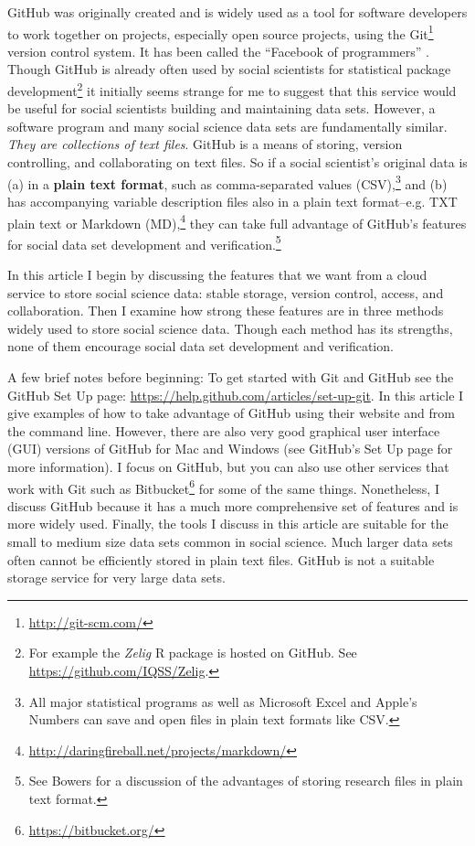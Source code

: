\documentclass[twocolumn]{article}\usepackage{graphicx, color}
\begin{document}
GitHub was originally created and is widely used as a tool for software developers to work together on projects, especially open source projects, using the Git\footnote{\url{http://git-scm.com/}} version control system. It has been called the ``Facebook of programmers'' \citep{Xie2011}. Though GitHub is already often used by social scientists for statistical package development\footnote{For example the \emph{Zelig} R package \citep{Zelig2008,R-zelig} is hosted on GitHub. See \url{https://github.com/IQSS/Zelig}.} it initially seems strange for me to suggest that this service would be useful for social scientists building and maintaining data sets. However, a software program and many social science data sets are fundamentally similar. \emph{They are collections of text files}. GitHub is a means of storing, version controlling, and collaborating on text files. So if a social scientist's original data is (a) in a \textbf{plain text format}, such as comma-separated values (CSV),\footnote{All major statistical programs as well as Microsoft Excel and Apple's Numbers can save and open files in plain text formats like CSV.} and (b) has accompanying variable description files also in a plain text format--e.g. TXT plain text or Markdown (MD),\footnote{\url{http://daringfireball.net/projects/markdown/}} they can take full advantage of GitHub's features for social data set development and verification.\footnote{See Bowers \citeyearpar[3]{Bowers2011} for a discussion of the advantages of storing research files in plain text format.}

In this article I begin by discussing the features that we want from a cloud service to store social science data: stable storage, version control, access, and collaboration. Then I examine how strong these features are in three methods widely used to store social science data. Though each method has its strengths, none of them encourage social data set development and verification.

A few brief notes before beginning: To get started with Git and GitHub see the GitHub Set Up page: \url{https://help.github.com/articles/set-up-git}. In this article I give examples of how to take advantage of GitHub using their website and from the command line. However, there are also very good graphical user interface (GUI) versions of GitHub for Mac and Windows (see GitHub's Set Up page for more information). I focus on GitHub, but you can also use other services that work with Git such as Bitbucket\footnote{\url{https://bitbucket.org/}} for some of the same things. Nonetheless, I discuss GitHub because it has a much more comprehensive set of features and is more widely used. Finally, the tools I discuss in this article are suitable for the small to medium size data sets common in social science. Much larger data sets often cannot be efficiently stored in plain text files. GitHub is not a suitable storage service for very large data sets.
\end{document}
